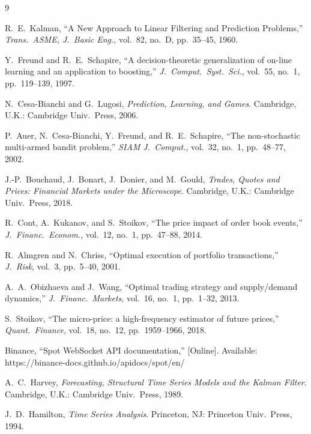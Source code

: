 \documentclass[journal,onecolumn,11pt]{IEEEtran}
\begin{document}
\begin{thebibliography}{9}

R.~E.~Kalman,
``A New Approach to Linear Filtering and Prediction Problems,''
\emph{Trans.\ ASME, J.\ Basic Eng.}, vol.~82, no.~D, pp.~35--45, 1960.

Y.~Freund and R.~E.~Schapire,
``A decision-theoretic generalization of on-line learning and an application to boosting,''
\emph{J.\ Comput.\ Syst.\ Sci.}, vol.~55, no.~1, pp.~119--139, 1997.

N.~Cesa-Bianchi and G.~Lugosi,
\emph{Prediction, Learning, and Games}.
Cambridge, U.K.: Cambridge Univ.\ Press, 2006.

P.~Auer, N.~Cesa-Bianchi, Y.~Freund, and R.~E.~Schapire,
``The non-stochastic multi-armed bandit problem,''
\emph{SIAM J.\ Comput.}, vol.~32, no.~1, pp.~48--77, 2002.

J.-P.~Bouchaud, J.~Bonart, J.~Donier, and M.~Gould,
\emph{Trades, Quotes and Prices: Financial Markets under the Microscope}.
Cambridge, U.K.: Cambridge Univ.\ Press, 2018.

R.~Cont, A.~Kukanov, and S.~Stoikov,
``The price impact of order book events,''
\emph{J.\ Financ.\ Econom.}, vol.~12, no.~1, pp.~47--88, 2014.

R.~Almgren and N.~Chriss,
``Optimal execution of portfolio transactions,''
\emph{J.\ Risk}, vol.~3, pp.~5--40, 2001.

A.~A.~Obizhaeva and J.~Wang,
``Optimal trading strategy and supply/demand dynamics,''
\emph{J.\ Financ.\ Markets}, vol.~16, no.~1, pp.~1--32, 2013.

S.~Stoikov,
``The micro-price: a high-frequency estimator of future prices,''
\emph{Quant.\ Finance}, vol.~18, no.~12, pp.~1959--1966, 2018.

Binance, ``Spot WebSocket API documentation,''
[Online]. Available: https://binance-docs.github.io/apidocs/spot/en/

A.~C.~Harvey,
\emph{Forecasting, Structural Time Series Models and the Kalman Filter}.
Cambridge, U.K.: Cambridge Univ.\ Press, 1989.

J.~D.~Hamilton,
\emph{Time Series Analysis}.
Princeton, NJ: Princeton Univ.\ Press, 1994.


\end{thebibliography}
\end{document}
